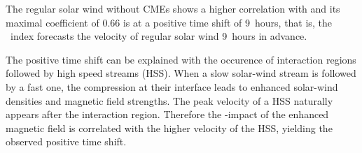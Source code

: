 % 
The regular solar wind without CMEs shows a higher correlation with \Kp{} and its maximal coefficient of 0.66 is at a positive time shift of 9~hours, that is, the \Kp~index forecasts the velocity of regular solar wind 9~hours in advance.

The positive time shift can be explained with the occurence of interaction regions followed by high speed streams (HSS). When a slow solar-wind stream is followed by a fast one, the compression at their interface leads to enhanced solar-wind densities and magnetic field strengths. The peak velocity of a HSS naturally appears after the interaction region. Therefore the \Kp-impact of the enhanced magnetic field is correlated with the higher velocity of the HSS, yielding the observed positive time shift.\\


